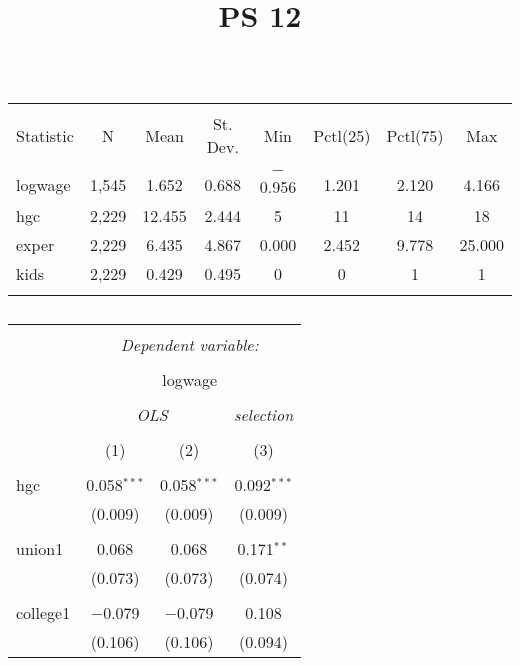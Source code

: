 \documentclass{article} \usepackage[utf8]{inputenc} \title{PS 12}
\begin{document}
\begin{table}[!htbp] \centering
  \caption{}
  \label{} \begin{tabular}{@{\extracolsep{5pt}}lccccccc} 
\\[-1.8ex]\hline \hline \\[-1.8ex] Statistic & \multicolumn{1}{c}{N} & 
\multicolumn{1}{c}{Mean} & \multicolumn{1}{c}{St. Dev.} & 
\multicolumn{1}{c}{Min} & \multicolumn{1}{c}{Pctl(25)} & 
\multicolumn{1}{c}{Pctl(75)} & \multicolumn{1}{c}{Max} \\ \hline 
\\[-1.8ex] logwage & 1,545 & 1.652 & 0.688 & $-$0.956 & 1.201 & 2.120 & 
4.166 \\ hgc & 2,229 & 12.455 & 2.444 & 5 & 11 & 14 & 18 \\ exper & 
2,229 & 6.435 & 4.867 & 0.000 & 2.452 & 9.778 & 25.000 \\ kids & 2,229 & 
0.429 & 0.495 & 0 & 0 & 1 & 1 \\ \hline \\[-1.8ex] \end{tabular} 
\end{table} \begin{table}[!htbp] \centering
  \caption{}
  \label{} \begin{tabular}{@{\extracolsep{5pt}}lccc} \\[-1.8ex]\hline 
\hline \\[-1.8ex]
 & \multicolumn{3}{c}{\textit{Dependent variable:}} \\ \cline{2-4} 
\\[-1.8ex] & \multicolumn{3}{c}{logwage} \\ \\[-1.8ex] & 
\multicolumn{2}{c}{\textit{OLS}} & \textit{selection} \\ \\[-1.8ex] & 
(1) & (2) & (3)\\ \hline \\[-1.8ex]
 hgc & 0.058$^{***}$ & 0.058$^{***}$ & 0.092$^{***}$ \\
  & (0.009) & (0.009) & (0.009) \\
  & & & \\
 union1 & 0.068 & 0.068 & 0.171$^{**}$ \\
  & (0.073) & (0.073) & (0.074) \\
  & & & \\
 college1 & $-$0.079 & $-$0.079 & 0.108 \\
  & (0.106) & (0.106) & (0.094) \\

\end{tabular}
\end{table}
\end{document}

